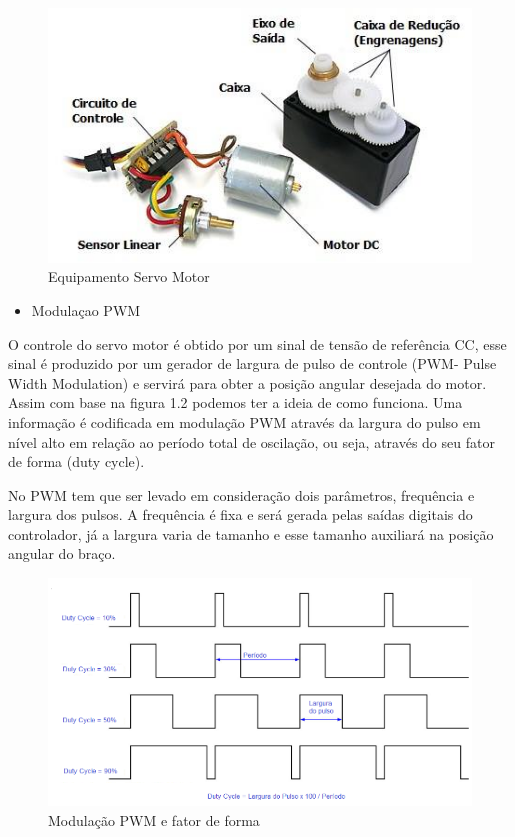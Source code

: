\begin{figure}[!h]
\centering
\includegraphics[scale=0.65, angle = 360]{figuras/lala2}
\caption[]{Equipamento Servo Motor}
\label{Equipamento Servo Motor}
\end{figure}
\FloatBarrier

\begin{itemize}
\item{Modulaçao PWM}
\end{itemize}

O controle do servo motor é obtido por um sinal de tensão de referência CC, esse sinal é produzido por um gerador de largura de pulso de controle (PWM- Pulse Width Modulation) e servirá para obter a posição angular desejada do motor. Assim com base na figura 1.2 podemos ter a ideia de como funciona. Uma informação é codificada em modulação PWM através da largura do pulso em nível alto em relação ao período total de oscilação, ou seja, através do seu fator de forma (duty cycle).

No PWM tem que ser levado em consideração dois parâmetros, frequência e largura dos pulsos. A frequência é fixa e será gerada pelas saídas digitais do controlador, já a largura varia de tamanho e esse tamanho auxiliará na posição angular do braço.

\begin{figure}[!h]
\centering
\includegraphics[scale=0.65, angle = 360]{figuras/lala3}
\caption[]{Modulação PWM e fator de forma}
\label{Modulação PWM e fator de forma}
\end{figure}
\FloatBarrier

